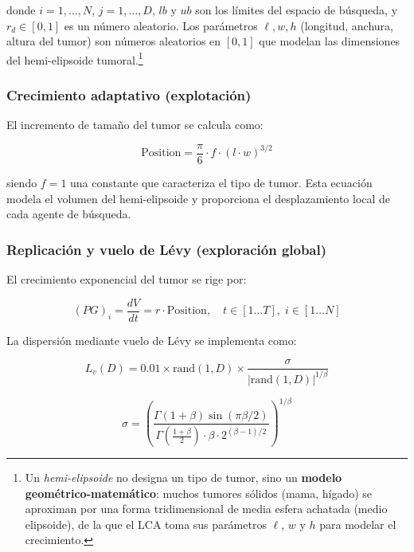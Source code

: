donde $i = 1,\ldots,N$, $j = 1,\ldots,D$, $lb$ y $ub$ son los límites del espacio de
búsqueda, y $r_d \in [0,1]$ es un número aleatorio. Los parámetros $\ell, w, h$
(longitud, anchura, altura del tumor) son números aleatorios en $[0,1]$ que modelan las
dimensiones del hemi-elipsoide tumoral.\footnote{Un \emph{hemi-elipsoide} no
designa un tipo de tumor, sino un \textbf{modelo geométrico-matemático}: muchos
tumores sólidos (mama, hígado) se aproximan por una forma tridimensional de media
esfera achatada (medio elipsoide), de la que el LCA toma sus parámetros $\ell$, $w$
y $h$ para modelar el crecimiento.}

\subsubsection{Crecimiento adaptativo (explotación)}

El incremento de tamaño del tumor se calcula como:

\begin{equation}
  \label{eq:crec}
  \text{Position} = \frac{\pi}{6} \cdot f \cdot (l \cdot w)^{3/2}
\end{equation}

siendo $f=1$ una constante que caracteriza el tipo de tumor. Esta ecuación modela el
volumen del hemi-elipsoide y proporciona el desplazamiento local de cada agente de búsqueda.

\subsubsection{Replicación y vuelo de Lévy (exploración global)}

El crecimiento exponencial del tumor se rige por:

\begin{equation}
  \label{eq:repl}
  (PG)_i = \frac{dV}{dt} = r \cdot \text{Position},
  \quad t \in [1\ldots T],\; i \in [1\ldots N]
\end{equation}

La dispersión mediante vuelo de Lévy se implementa como:

\begin{equation}
  \label{eq:levy}
  L_v(D) = 0.01 \times \text{rand}(1,D) \times \frac{\sigma}{|\text{rand}(1,D)|^{1/\beta}}
\end{equation}

\begin{equation}
  \sigma = \left(\frac{\Gamma(1+\beta)\sin(\pi\beta/2)}
    {\Gamma\!\left(\frac{1+\beta}{2}\right)\cdot\beta\cdot 2^{(\beta-1)/2}}\right)^{1/\beta}
\end{equation}

